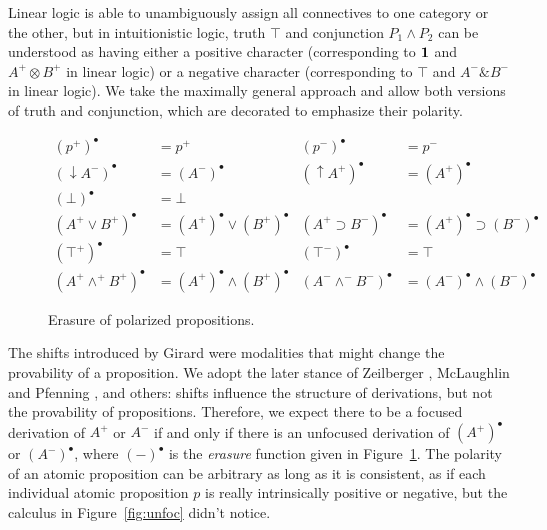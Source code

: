 \documentclass[acmtocl]{robtrans}\pdfoutput=1
\DeclareMathOperator{\with}{\&}
\begin{document}
Linear logic is able to unambiguously assign all connectives
to one category or the other, but in intuitionistic logic, truth
$\top$ and conjunction $P_1 \wedge P_2$
can be understood as having either a positive character (corresponding to
${\bf 1}$ and $A^+ \otimes B^+$ in linear logic) or a negative character
(corresponding to $\top$ and $A^- \with B^-$ in linear logic). 
We take the maximally general approach and allow both versions of 
truth and conjunction, which are decorated to emphasize their polarity.

\begin{figure}
\begin{align*}
(p^+)^\bullet & = p^+
  & (p^-)^\bullet & = p^-\\
({\downarrow}A^-)^\bullet & = (A^-)^\bullet
 & ({\uparrow}A^+)^\bullet & = (A^+)^\bullet\\
(\bot)^\bullet & = \bot\\
(A^+ \vee B^+)^\bullet & = (A^+)^\bullet \vee (B^+)^\bullet
 & (A^+ \supset B^-)^\bullet & = (A^+)^\bullet \supset (B^-)^\bullet\\
(\top^+)^\bullet & = \top
 & (\top^-)^\bullet & = \top\\
(A^+ \wedge^+ B^+)^\bullet & = (A^+)^\bullet \wedge (B^+)^\bullet
 & (A^- \wedge^- B^-)^\bullet & = (A^-)^\bullet \wedge (B^-)^\bullet
\end{align*}
\caption{Erasure of polarized propositions.}
\label{fig:erasure}
\end{figure}

The shifts introduced by Girard were modalities that might change the
provability of a proposition. We adopt the later stance of Zeilberger
, McLaughlin and Pfenning
, and others: shifts influence the
structure of derivations, but not the provability of
propositions. Therefore, we expect there to be a focused derivation of
$A^+$ or $A^-$ if and only if there is an unfocused derivation of
$(A^+)^\bullet$ or $(A^-)^\bullet$, where $(-)^\bullet$ is the {\it
  erasure} function given in Figure~\ref{fig:erasure}.  The polarity
of an atomic proposition can be arbitrary as long as it is consistent,
as if each individual atomic proposition $p$ is really intrinsically
positive or negative, but the calculus in Figure~\ref{fig:unfoc}
didn't notice.
\end{document}
